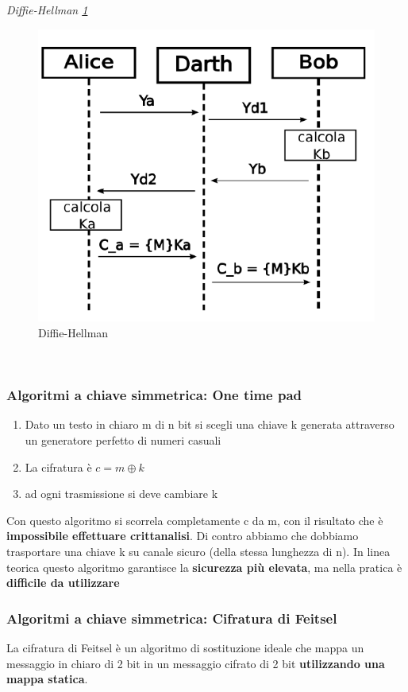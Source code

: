 \documentclass[12pt]{article}
\begin{document}
 				\textit{Diffie-Hellman \ref{fig:19}}\\
 				\begin{figure}[h!]
 					\centering
 					\includegraphics[scale=0.60]{img/diffie.PNG}
 					\caption{Diffie-Hellman \label{fig:19}}
 				\end{figure}\\
 			
 			\subsubsection{Algoritmi a chiave simmetrica: One time pad}
 				\begin{enumerate}
 					\item Dato un testo in chiaro m di n bit si scegli una chiave k generata attraverso un generatore perfetto di numeri casuali
 					\item La cifratura è $c=m\oplus k$
	 				\item ad ogni trasmissione si deve cambiare k
 				\end{enumerate}
 				Con questo algoritmo si scorrela completamente c da m, con il risultato che è \textbf{impossibile effettuare crittanalisi}. Di contro abbiamo che dobbiamo trasportare una chiave k su canale sicuro (della stessa lunghezza di n). In linea teorica questo algoritmo garantisce la \textbf{sicurezza più elevata}, ma nella pratica è \textbf{difficile da utilizzare}
 			
 			\subsubsection{Algoritmi a chiave simmetrica: Cifratura di Feitsel}
 				La cifratura di Feitsel è un algoritmo di sostituzione ideale che mappa un messaggio in chiaro di 2 bit in un messaggio cifrato di 2 bit \textbf{utilizzando una mappa statica}.\\
 				
\end{document}
